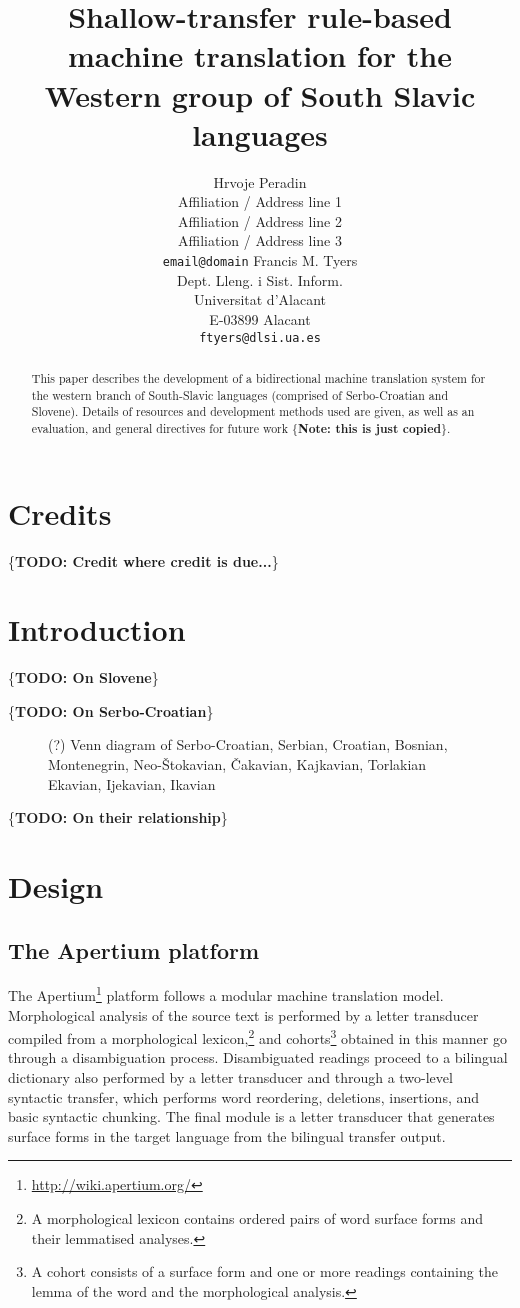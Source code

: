 \documentclass[11pt]{article}
\title{Shallow-transfer rule-based machine translation for the Western group of South Slavic languages}
\author{Hrvoje Peradin\\
  Affiliation / Address line 1\\
  Affiliation / Address line 2\\
  Affiliation / Address line 3\\
  {\tt email@domain}  \And
  Francis M. Tyers\\
  Dept. Lleng. i Sist. Inform.\\
  Universitat d'Alacant\\
  E-03899 Alacant\\
  {\tt ftyers@dlsi.ua.es}}
\date{}
\newcommand{\todo}[1]{\{\textbf{TODO: #1}\}}
\newcommand{\note}[1]{\{\textbf{Note: #1}\}}
\begin{document}
\maketitle
\begin{abstract}
  This paper describes the development of a bidirectional machine
  translation system for the western branch of South-Slavic languages
  (comprised of Serbo-Croatian and Slovene). Details of resources and
  development methods used are given, as well as an evaluation, and
  general directives for future work \note{this is just copied}.
\end{abstract}

\section{Credits}

\todo{Credit where credit is due...}

\section{Introduction}

\todo{On Slovene}

\todo{On Serbo-Croatian}

\begin{figure}

(?) Venn diagram of Serbo-Croatian, Serbian, Croatian, Bosnian, Montenegrin, 
Neo-Štokavian, Čakavian, Kajkavian, Torlakian
Ekavian, Ijekavian, Ikavian

\end{figure}

\todo{On their relationship}

\section{Design}

\subsection* {The Apertium platform}
\nocite{forcada2011apertium}
The Apertium\footnote{\url{http://wiki.apertium.org/}}  platform follows a modular machine translation model.
Morphological analysis of the source text is performed by a letter 
transducer compiled from a morphological lexicon,\footnote{A morphological lexicon 
contains ordered pairs of word surface forms and their lemmatised analyses.} 
and cohorts\footnote{A cohort 
consists of a surface form and one or more readings containing the lemma of the 
word and the morphological analysis.} obtained in this manner go through
a disambiguation process. 
Disambiguated readings proceed to a bilingual dictionary also performed 
by a letter transducer and  through a two-level syntactic transfer, 
which performs word reordering, deletions, insertions, and basic syntactic chunking.
The final module is a letter transducer that generates surface forms in the target language from 
the bilingual transfer output.
\end{document}
